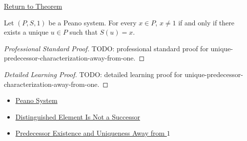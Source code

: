 \newpage
{}
\label{prf:unique-predecessor-characterization-away-from-one}

\begin{remark*}[Return]
\hyperref[cor:unique-predecessor-characterization-away-from-one]{Return to Theorem}
\end{remark*}

\begin{corollary*}
Let $(P,S,1)$ be a Peano system. For every $x \in P$, $x \neq 1$ if and
only if there exists a unique $u \in P$ such that $S(u)=x$.
\end{corollary*}

\begin{proof}[Professional Standard Proof]
\LRAProofBodyStart
TODO: professional standard proof for unique-predecessor-characterization-away-from-one.
\end{proof}

\begin{proof}[Detailed Learning Proof]
\LRAProofBodyStart
TODO: detailed learning proof for unique-predecessor-characterization-away-from-one.
\end{proof}

\begin{remark*}
\end{remark*}

\begin{dependencies}
\begin{itemize}
  \item \hyperref[def:peano-system]{Peano System}
  \item \hyperref[ax:peano-base-not-successor]{Distinguished Element Is Not a Successor}
  \item \hyperref[cor:predecessor-exists-unique-away-from-one]{Predecessor Existence and Uniqueness Away from $1$}
\end{itemize}
\end{dependencies}

\clearpage
